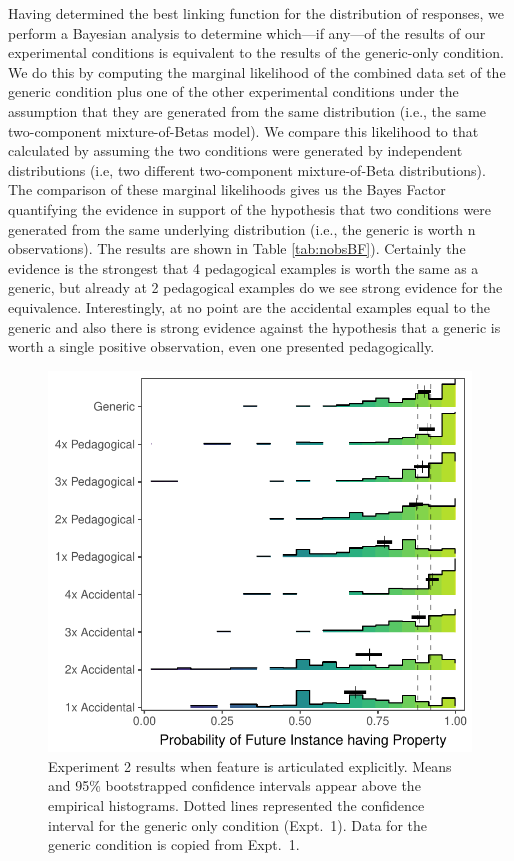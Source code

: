 \documentclass[10pt,letterpaper]{article}
\begin{document}
Having determined the best linking function for the distribution of responses, we perform a Bayesian analysis to determine which---if any---of the results of our experimental conditions is equivalent to the results of the generic-only condition. 
We do this by computing the marginal likelihood of the combined data set of the generic condition plus one of the other experimental conditions under the assumption that they are generated from the same distribution (i.e., the same two-component mixture-of-Betas model). 
We compare this likelihood to that calculated by assuming the two conditions were generated by independent distributions (i.e, two different two-component mixture-of-Beta distributions). 
The comparison of these marginal likelihoods gives us the Bayes Factor quantifying the evidence in support of the hypothesis that two conditions were generated from the same underlying distribution (i.e., the generic is worth n observations). 
The results are shown in Table \ref{tab:nobsBF}).
Certainly the evidence is the strongest that 4 pedagogical examples is worth the same as a generic, but already at 2 pedagogical examples do we see strong evidence for the equivalence. Interestingly, at no point are the accidental examples equal to the generic and also there is strong evidence against the hypothesis that a generic is worth a single positive observation, even one presented pedagogically.








\begin{figure}[t]
\begin{center}
 \includegraphics[width=\linewidth]{figs/genex-expt2_9conditions_reordered.pdf}
\end{center}
\caption{Experiment 2 results when feature is articulated explicitly. Means and 95\% bootstrapped confidence intervals appear above the empirical histograms. Dotted lines represented the confidence interval for the generic only condition (Expt.~1). Data for the generic condition is copied from Expt.~1.}
\label{fig:results2}
\end{figure}
\end{document}
